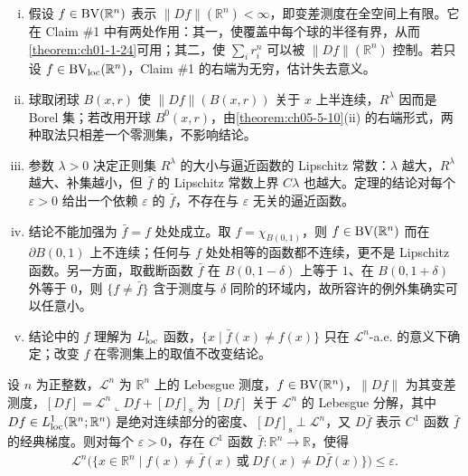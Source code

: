 \documentclass[../../main.tex]{subfiles}%
\begin{document}
\begin{remark}\label{remark:ch06-thm-6-12-条件}
\begin{enumerate}[(i)]
\item 假设 $f\in\mathrm{BV}(\mathbb{R}^n)$ 表示 $\lVert Df\rVert(\mathbb{R}^n)<\infty$，即变差测度在全空间上有限。它在 Claim \#1 中有两处作用：其一，使覆盖中每个球的半径有界，从而\cref{theorem:ch01-1-24}可用；其二，使 $\sum_ir_i^n$ 可以被 $\lVert Df\rVert(\mathbb{R}^n)$ 控制。若只设 $f\in\mathrm{BV}_{\mathrm{loc}}(\mathbb{R}^n)$，Claim \#1 的右端为无穷，估计失去意义。%
\item 球取闭球 $B(x,r)$ 使 $\lVert Df\rVert(B(x,r))$ 关于 $x$ 上半连续，$R^\lambda$ 因而是 Borel 集；若改用开球 $B^0(x,r)$，由\cref{theorem:ch05-5-10}(ii) 的右端形式，两种取法只相差一个零测集，不影响结论。%
\item 参数 $\lambda>0$ 决定正则集 $R^\lambda$ 的大小与逼近函数的 Lipschitz 常数：$\lambda$ 越大，$R^\lambda$ 越大、补集越小，但 $\bar f$ 的 Lipschitz 常数上界 $C\lambda$ 也越大。定理的结论对每个 $\varepsilon>0$ 给出一个依赖 $\varepsilon$ 的 $\bar f$，不存在与 $\varepsilon$ 无关的逼近函数。
\item 结论不能加强为 $\bar f=f$ 处处成立。取 $f=\chi_{B(0,1)}$，则 $f\in\mathrm{BV}(\mathbb{R}^n)$ 而在 $\partial B(0,1)$ 上不连续；任何与 $f$ 处处相等的函数都不连续，更不是 Lipschitz 函数。另一方面，取截断函数 $\bar f$ 在 $B(0,1-\delta)$ 上等于 $1$、在 $B(0,1+\delta)$ 外等于 $0$，则 $\{f\ne\bar f\}$ 含于测度与 $\delta$ 同阶的环域内，故所容许的例外集确实可以任意小。
\item 结论中的 $f$ 理解为 $L^1_{\mathrm{loc}}$ 函数，$\{x\mid\bar f(x)\ne f(x)\}$ 只在 $\mathcal{L}^n$-a.e. 的意义下确定；改变 $f$ 在零测集上的取值不改变结论。
\end{enumerate}
\end{remark}

\begin{theorem}[$\BV$ 函数的逐点逼近]\label{theorem:ch06-6-13}
设 $n$ 为正整数，$\mathcal{L}^n$ 为 $\mathbb{R}^n$ 上的 Lebesgue 测度，$f\in\mathrm{BV}(\mathbb{R}^n)$，$\lVert Df\rVert$ 为其变差测度，$[Df]=\mathcal{L}^n\llcorner Df+[Df]_{\mathrm{s}}$ 为 $[Df]$ 关于 $\mathcal{L}^n$ 的 Lebesgue 分解，其中 $Df\in L^1_{\mathrm{loc}}(\mathbb{R}^n;\mathbb{R}^n)$ 是绝对连续部分的密度、$[Df]_{\mathrm{s}}\perp\mathcal{L}^n$，又 $D\bar f$ 表示 $C^1$ 函数 $\bar f$ 的经典梯度。则对每个 $\varepsilon>0$，存在 $C^1$ 函数 $\bar f:\mathbb{R}^n\to\mathbb{R}$，使得
\begin{align*}
\mathcal{L}^n\bigl(\{x\in\mathbb{R}^n\mid f(x)\ne\bar f(x)\ \text{或}\ Df(x)\ne D\bar f(x)\}\bigr)\le\varepsilon .
\end{align*}
\end{theorem}
\end{document}
